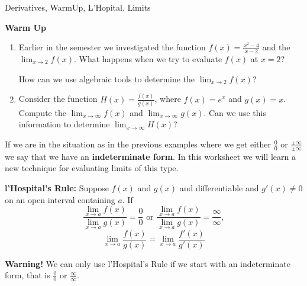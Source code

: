 \begin{tagblock}{Derivatives, WarmUp, L'Hopital, Limits }

\begin{question}

\textbf{Warm Up}

\begin{enumerate}
\item Earlier in the semester we investigated the function $\displaystyle f(x) = \frac{x^2-4}{x-2}$ and the $\lim_{x \to 2} f(x)$.  
What happens when we try to evaluate $f(x)$ at $x=2$?  
\vspace{.5in}

 How can we use algebraic tools to determine  the $\displaystyle \lim_{x \to 2} f(x)$?  
 \vspace{1in}
 
 \item Consider the function $\displaystyle H(x) = \frac{f(x)}{g(x)}$, where $f(x) = {e^x}$ and $g(x) = {x}$.  Compute the $\displaystyle \lim_{x \to \infty} f(x)$ and $\displaystyle \lim_{x \to \infty} g(x)$.  Can we use this information to determine $\displaystyle \lim_{x \to \infty} H(x)$?  
 
 
 \vspace{1in}
 
 \end{enumerate}
 
 If we are in the situation as in the previous examples where we get either $\frac{0}{0}$ or $\frac{\pm \infty}{\pm \infty}$ we say that we have an \textbf{indeterminate form}.  In this worksheet we will learn a new technique for evaluating limits of this type.  
 
 
 


\begin{tcolorbox}
 \textbf{l'Hospital's Rule:} Suppose $f(x)$ and $g(x)$ and differentiable and $g'(x) \neq 0$ on an open interval containing $a$.  If 
\[\frac{\lim_{x \to a}f(x)} { \lim_{x \to a}g(x)} = \frac{0}{0} \text{ or } \frac{\lim_{x \to a}f(x)} { \lim_{x \to a}g(x)} = \frac{\infty}{\infty}, \] \[ \lim_{x \to a} \frac{f(x)}{g(x)} = \lim_{x \to a} \frac{f'(x)}{g'(x)}\]

\end{tcolorbox}

\bigskip

\textbf{Warning!} We can only use l'Hospital's Rule if we start with an indeterminate form, that is $\frac{0}{0}$ or $\frac{\infty}{\infty}$.



\end{question}
\end{tagblock}
